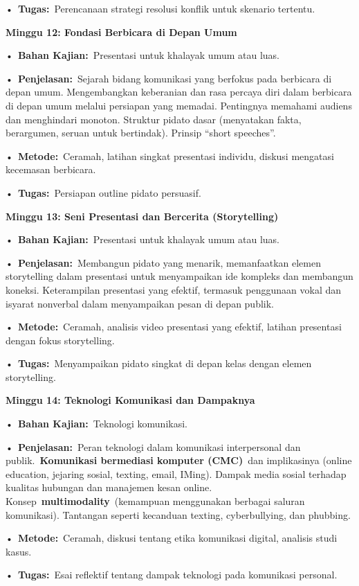 \documentclass[
  letterpaper,
  DIV=11,
  numbers=noendperiod]{scrreprt}
\begin{document}
•~\textbf{Tugas:}~Perencanaan strategi resolusi konflik untuk skenario
tertentu.

\textbf{Minggu 12: Fondasi Berbicara di Depan Umum}

•~\textbf{Bahan Kajian:}~Presentasi untuk khalayak umum atau luas.

•~\textbf{Penjelasan:}~Sejarah bidang komunikasi yang berfokus pada
berbicara di depan umum. Mengembangkan keberanian dan rasa percaya diri
dalam berbicara di depan umum melalui persiapan yang memadai. Pentingnya
memahami audiens dan menghindari monoton. Struktur pidato dasar
(menyatakan fakta, berargumen, seruan untuk bertindak). Prinsip ``short
speeches''.

•~\textbf{Metode:}~Ceramah, latihan singkat presentasi individu, diskusi
mengatasi kecemasan berbicara.

•~\textbf{Tugas:}~Persiapan outline pidato persuasif.

\textbf{Minggu 13: Seni Presentasi dan Bercerita (Storytelling)}

•~\textbf{Bahan Kajian:}~Presentasi untuk khalayak umum atau luas.

•~\textbf{Penjelasan:}~Membangun pidato yang menarik, memanfaatkan
elemen storytelling dalam presentasi untuk menyampaikan ide kompleks dan
membangun koneksi. Keterampilan presentasi yang efektif, termasuk
penggunaan vokal dan isyarat nonverbal dalam menyampaikan pesan di depan
publik.

•~\textbf{Metode:}~Ceramah, analisis video presentasi yang efektif,
latihan presentasi dengan fokus storytelling.

•~\textbf{Tugas:}~Menyampaikan pidato singkat di depan kelas dengan
elemen storytelling.

\textbf{Minggu 14: Teknologi Komunikasi dan Dampaknya}

•~\textbf{Bahan Kajian:}~Teknologi komunikasi.

•~\textbf{Penjelasan:}~Peran teknologi dalam komunikasi interpersonal
dan publik.~\textbf{Komunikasi bermediasi komputer (CMC)}~dan
implikasinya (online education, jejaring sosial, texting, email, IMing).
Dampak media sosial terhadap kualitas hubungan dan manajemen kesan
online. Konsep~\textbf{multimodality}~(kemampuan menggunakan berbagai
saluran komunikasi). Tantangan seperti kecanduan texting, cyberbullying,
dan phubbing.

•~\textbf{Metode:}~Ceramah, diskusi tentang etika komunikasi digital,
analisis studi kasus.

•~\textbf{Tugas:}~Esai reflektif tentang dampak teknologi pada
komunikasi personal.
\end{document}
